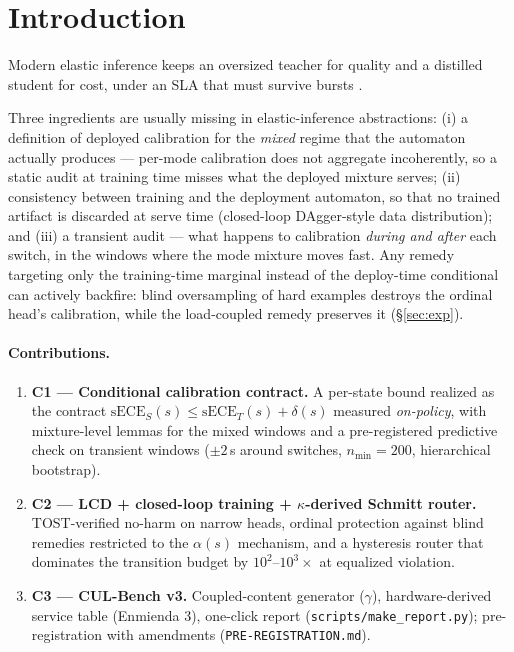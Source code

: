 \documentclass[sigconf,nonacm]{acmart}
\newcommand{\sece}{\mathrm{sECE}}
\newcommand{\delt}{\delta}
\begin{document}
\section{Introduction}
\label{sec:intro}
Modern elastic inference keeps an oversized teacher for quality and a
distilled student for cost, under an SLA that must survive bursts
\citep{clipper2017,infaas2020,chen2023frugalgpt}.

Three ingredients are usually missing in elastic-inference abstractions:
(i) a definition of deployed calibration for the \emph{mixed} regime that
the automaton actually produces — per-mode calibration does not aggregate
incoherently, so a static audit at training time misses what the deployed
mixture serves; (ii) consistency between training and the deployment
automaton, so that no trained artifact is discarded at serve time
(closed-loop DAgger-style data distribution); and (iii) a transient
audit — what happens to calibration \emph{during and after} each switch,
in the windows where the mode mixture moves fast. Any remedy targeting
only the training-time marginal instead of the deploy-time conditional
can actively backfire: blind oversampling of hard examples destroys the
ordinal head's calibration, while the load-coupled remedy preserves it
(§\ref{sec:exp}).

\paragraph{Contributions.}
\begin{enumerate}
\item \textbf{C1 — Conditional calibration contract.} A per-state bound
realized as the contract $\sece_S(s)\le \sece_T(s)+\delt(s)$ measured
\emph{on-policy}, with mixture-level lemmas for the mixed windows and a
pre-registered predictive check on transient windows ($\pm 2$\,s around
switches, $n_{\min}{=}200$, hierarchical bootstrap).
\item \textbf{C2 — LCD + closed-loop training + $\kappa$-derived Schmitt router.}
TOST-verified no-harm on narrow heads, ordinal protection against blind
remedies restricted to the $\alpha(s)$ mechanism, and a
hysteresis router that dominates the transition budget by
$10^2$--$10^3\times$ at equalized violation.
\item \textbf{C3 — CUL-Bench v3.} Coupled-content generator ($\gamma$),
hardware-derived service table (Enmienda 3), one-click report
(\texttt{scripts/make\_report.py}); pre-registration with amendments
(\texttt{PRE-REGISTRATION.md}).
\end{enumerate}
\end{document}
